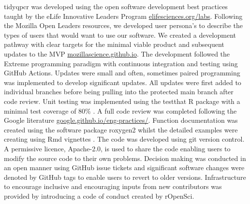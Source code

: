 \documentclass[../main.tex]{subfiles}
\begin{document}
tidyqpcr was developed using the open software development best practices taught by the eLife Innovative Leaders Program \href{https://elifesciences.org/labs/bced51c5/innovation-leaders-2020-a-summary}{elifesciences.org/labs}.
Following the Mozilla Open Leaders resources, we developed user persona's to describe the types of users that would want to use our software.
We created a development pathway with clear targets for the minimal viable product and subsequent updates to the MVP \href{http://mozillascience.github.io/working-open-workshop/personas_pathways/}{mozillascience.github.io}.
The development followed the Extreme programming paradigm with continuous integration and testing using GitHub Actions.
Updates were small and often, sometimes paired programming was implemented to develop significant updates.
All updates were first added to individual branches before being pulling into the protected main branch after code review.
Unit testing was implemented using the testthat R package with a minimal test coverage of 80\% \parencite{Wickham2011}.
A full code review was completed following the Google literature  \href{https://google.github.io/eng-practices/review/}{google.github.io/eng-practices/}.
Function documentation was created using the software package roxygen2 whilst the detailed examples were creating using Rmd vignettes \parencite{Wickham2022, Wickham2021}.
The code was developed using git version control.
A permissive licence, Apache-2.0, is used to share the code enabling users to modify the source code to their own problems.
Decision making was conducted in an open manner using GitHub issue tickets and significant software changes were denoted by GitHub tags to enable users to revert to older versions.
Infrastructure to encourage inclusive and encouraging inputs from new contributors was provided by introducing a code of conduct created by rOpenSci.
\end{document}
